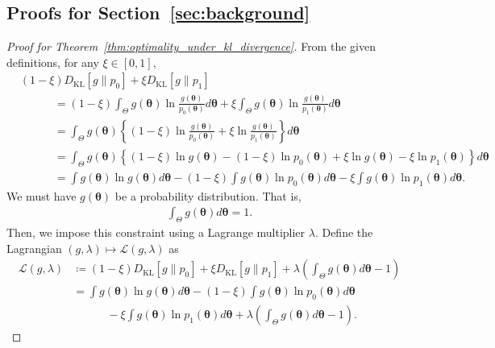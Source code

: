 \documentclass[12pt]{article}
\begin{document}
\subsection{Proofs for Section~\ref{sec:background}}

\begin{proof}[Proof for Theorem~\ref{thm:optimality_under_kl_divergence}]
    From the given definitions, for any $\xi \in [0, 1]$,
    \begin{align*}
        & (1 - \xi) D_{\mathrm{KL}}[g \| p_0] + \xi D_{\mathrm{KL}}[g \| p_1] \\
        &\quad\quad\quad = (1 - \xi)\int_\Theta g(\bm{\theta})\ln\frac{g(\bm{\theta})}{p_0(\bm{\theta})}d\bm{\theta} + \xi \int_\Theta g(\bm{\theta})\ln\frac{g(\bm{\theta})}{p_1(\bm{\theta})}d\bm{\theta} \\
        &\quad\quad\quad = \int_\Theta g(\bm{\theta})\left\{(1 - \xi)\ln\frac{g(\bm{\theta})}{p_0(\bm{\theta})} + \xi \ln\frac{g(\bm{\theta})}{p_1(\bm{\theta})} \right\} d\bm{\theta} \\
        &\quad\quad\quad = \int_\Theta g(\bm{\theta})\left\{(1 - \xi) \ln g(\bm{\theta}) - (1 - \xi) \ln p_0(\bm{\theta}) + \xi \ln g(\bm{\theta}) - \xi \ln p_1(\bm{\theta})\right\} d\bm{\theta} \\
        &\quad\quad\quad = \int g(\bm{\theta})\ln g(\bm{\theta}) d\bm{\theta} - (1 - \xi) \int g(\bm{\theta}) \ln p_0(\bm{\theta})d\bm{\theta} - \xi \int g(\bm{\theta})\ln p_1(\bm{\theta})d\bm{\theta}.
    \end{align*}
    We must have $g(\bm{\theta})$ be a probability distribution.
    That is,
    \begin{align*}
        \int_\Theta g(\bm{\theta})d\bm{\theta} = 1.
    \end{align*}
    Then, we impose this constraint using a Lagrange multiplier $\lambda$.
    Define the Lagrangian $(g, \lambda) \mapsto \mathcal{L}(g, \lambda)$ as
    \begin{align*}
        \mathcal{L}(g, \lambda) &\coloneqq (1 - \xi) D_{\mathrm{KL}}[g \| p_0] + \xi D_{\mathrm{KL}}[g \| p_1] + \lambda \left(\int_\Theta g(\bm{\theta})d\bm{\theta} - 1\right) \\
        &= \int g(\bm{\theta})\ln g(\bm{\theta}) d\bm{\theta} - (1 - \xi) \int g(\bm{\theta}) \ln p_0(\bm{\theta})d\bm{\theta} \\
        &\quad\quad\quad - \xi \int g(\bm{\theta})\ln p_1(\bm{\theta})d\bm{\theta} + \lambda \left(\int_\Theta g(\bm{\theta})d\bm{\theta} - 1\right).
    \end{align*}

\end{proof}
\end{document}
